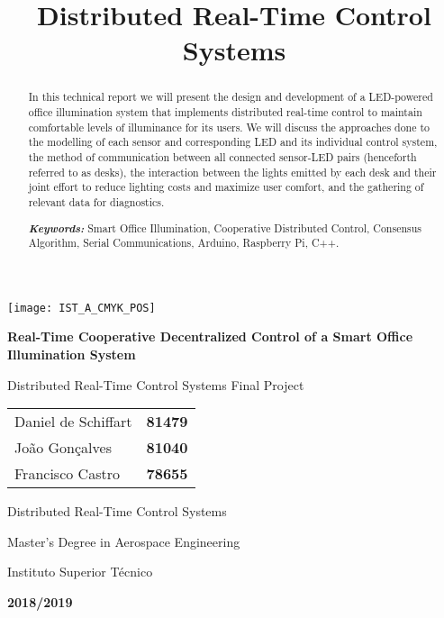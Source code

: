 \documentclass[english,fira]{ist-report}
\title{Distributed Real-Time Control Systems}
\begin{document}
\begin{titlepage}

\begin{center}
	\vspace*{0.1\textheight}
	\texttt{[image: IST\_A\_CMYK\_POS]}
	
	\vspace*{0.1\textheight}
	{\huge\bfseries Real-Time Cooperative Decentralized Control of a Smart Office Illumination System}
	
	\vspace*{0.03\textheight}
	{\Large Distributed Real-Time Control Systems Final Project}
	
	\vspace*{43.5mm}
	{\Large \begin{tabular}{l r} Daniel de Schiffart & \textbf{81479} \\ João Gonçalves & \textbf{81040} \\ Francisco Castro & \textbf{78655}\end{tabular}}
	
	\vspace{\fill}
	{\large Distributed Real-Time Control Systems}
	
	\vspace*{0.01\textheight}
	{\Large Master's Degree in Aerospace Engineering}
	
	\vspace*{0.01\textheight}
	{\large Instituto Superior Técnico}
	
	\vspace*{0.8cm}
	{\large\bfseries 2018/2019}
\end{center}

\end{titlepage}
\setcounter{page}{1}

\begin{abstract}
	In this technical report we will present the design and development of a LED-powered office illumination system that implements distributed real-time control to maintain comfortable levels of illuminance for its users. We will discuss the approaches done to the modelling of each sensor and corresponding LED and its individual control system, the method of communication between all connected sensor-LED pairs (henceforth referred to as desks), the interaction between the lights emitted by each desk and their joint effort to reduce lighting costs and maximize user comfort, and the gathering of relevant data for diagnostics.
	\newline
	
	\textit{\textbf{Keywords:}} Smart Office Illumination, Cooperative Distributed Control, Consensus Algorithm, Serial Communications, Arduino, Raspberry Pi, C++.
\end{abstract}
\end{document}
